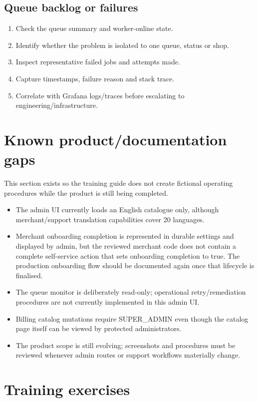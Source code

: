\section{Queue backlog or failures}
\begin{enumerate}
  \item Check the queue summary and worker-online state.
  \item Identify whether the problem is isolated to one queue, status or shop.
  \item Inspect representative failed jobs and attempts made.
  \item Capture timestamps, failure reason and stack trace.
  \item Correlate with Grafana logs/traces before escalating to engineering/infrastructure.
\end{enumerate}

\chapter{Known product/documentation gaps}

This section exists so the training guide does not create fictional operating procedures while the product is still being completed.

\begin{itemize}
  \item The admin UI currently loads an English catalogue only, although merchant/support translation capabilities cover 20 languages.
  \item Merchant onboarding completion is represented in durable settings and displayed by admin, but the reviewed merchant code does not contain a complete self-service action that sets onboarding completion to true. The production onboarding flow should be documented again once that lifecycle is finalised.
  \item The queue monitor is deliberately read-only; operational retry/remediation procedures are not currently implemented in this admin UI.
  \item Billing catalog mutations require SUPER\_ADMIN even though the catalog page itself can be viewed by protected administrators.
  \item The product scope is still evolving; screenshots and procedures must be reviewed whenever admin routes or support workflows materially change.
\end{itemize}

\chapter{Training exercises}

